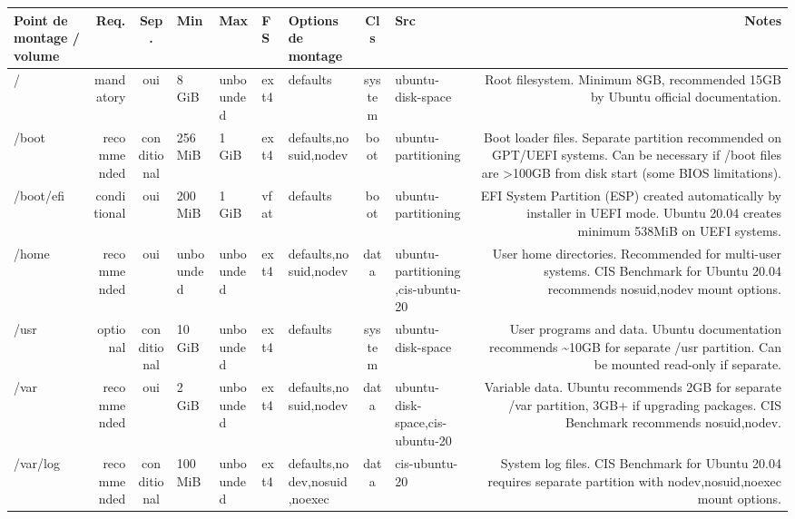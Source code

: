 \documentclass[10pt,a4paper]{article}
\renewcommand{\arraystretch}{1.2}
\begin{document}
{\renewcommand{\arraystretch}{1.15}\begin{longtable}{M R S Z Z T O C I N}\toprule\textbf{\normalfont\scriptsize Point de montage / volume} & \textbf{\normalfont\scriptsize Req.} & \textbf{\normalfont\scriptsize Sep.} & \textbf{\normalfont\scriptsize Min} & \textbf{\normalfont\scriptsize Max} & \textbf{\normalfont\scriptsize FS} & \textbf{\normalfont\scriptsize Options de montage} & \textbf{\normalfont\scriptsize Cls} & \textbf{\normalfont\scriptsize Src} & \textbf{\normalfont\scriptsize Notes}\\\midrule\endhead
/ & \textcolor{cBlock}{mandatory} & \textcolor{cOk}{oui} & 8 GiB & unbounded & ext4 & defaults & system & ubuntu-disk-space & Root filesystem. Minimum 8GB, recommended 15GB by Ubuntu official documentation.\\
/boot & \textcolor{cHigh}{recommended} & conditional & 256 MiB & 1 GiB & ext4 & defaults,nosuid,nodev & boot & ubuntu-partitioning & Boot loader files. Separate partition recommended on GPT/UEFI systems. Can be necessary if /boot files are >100GB from disk start (some BIOS limitations).\\
/boot/efi & \textcolor{cMed}{conditional} & \textcolor{cOk}{oui} & 200 MiB & 1 GiB & vfat & defaults & boot & ubuntu-partitioning & EFI System Partition (ESP) created automatically by installer in UEFI mode. Ubuntu 20.04 creates minimum 538MiB on UEFI systems.\\
/home & \textcolor{cHigh}{recommended} & \textcolor{cOk}{oui} & unbounded & unbounded & ext4 & defaults,nosuid,nodev & data & ubuntu-partitioning,cis-ubuntu-20 & User home directories. Recommended for multi-user systems. CIS Benchmark for Ubuntu 20.04 recommends nosuid,nodev mount options.\\
/usr & \textcolor{cLow}{optional} & conditional & 10 GiB & unbounded & ext4 & defaults & system & ubuntu-disk-space & User programs and data. Ubuntu documentation recommends \textasciitilde{}10GB for separate /usr partition. Can be mounted read-only if separate.\\
/var & \textcolor{cHigh}{recommended} & \textcolor{cOk}{oui} & 2 GiB & unbounded & ext4 & defaults,nosuid,nodev & data & ubuntu-disk-space,cis-ubuntu-20 & Variable data. Ubuntu recommends 2GB for separate /var partition, 3GB+ if upgrading packages. CIS Benchmark recommends nosuid,nodev.\\
/var/log & \textcolor{cHigh}{recommended} & conditional & 100 MiB & unbounded & ext4 & defaults,nodev,nosuid,noexec & data & cis-ubuntu-20 & System log files. CIS Benchmark for Ubuntu 20.04 requires separate partition with nodev,nosuid,noexec mount options.\\

\end{longtable}}
\end{document}
